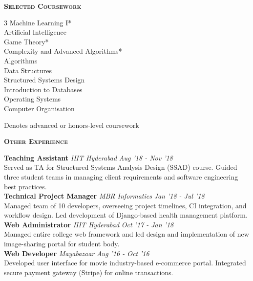\documentclass[10pt]{article}
\newcommand{\headerwidth}{7.45in}
\newenvironment{changemargin}[2]{%
  \begin{list}{}{%
    \setlength{\topsep}{0pt}%
    \setlength{\leftmargin}{#1}%
    \setlength{\rightmargin}{#2}%
    \setlength{\listparindent}{\parindent}%
    \setlength{\itemindent}{\parindent}%
    \setlength{\parsep}{\parskip}%
  }%
  \item[]}{\end{list}
}
\newcommand{\header}[1]{
	\begin{changemargin}{-0.75in}{-0.75in}
    \begin{tcolorbox}[colframe=mycolor,boxrule=0.0pt,arc=0pt,
      left=6pt,right=6pt,top=6pt,bottom=6pt,boxsep=0pt,width=\headerwidth]
		\scshape{\textbf{#1}}
\end{tcolorbox}
	\end{changemargin}
}
\newenvironment{body} {
	\vspace*{-16pt}
	\begin{changemargin}{-0.6in}{-0.65in}
  }
	{\end{changemargin}
}
\begin{document}
\smallskip
\header{Selected Coursework}
\begin{body}
	\vspace{4pt}
	\begin{multicols}{3}
	Machine Learning I*\\
	Artificial Intelligence\\
	Game Theory*\\
	Complexity and Advanced Algorithms*\\
	Algorithms\\
	Data Structures\\
	Structured Systems Design\\
	Introduction to Databases\\
	Operating Systems\\
	Computer Organisation\\
 	\end{multicols}
    {\footnotesize * Denotes advanced or honors-level coursework}
\end{body}


\smallskip
\header{Other Experience}
\begin{body}
	\vspace{10pt}
	\textbf{Teaching Assistant} \emph{IIIT Hyderabad} \hfill \emph{Aug '18 - Nov '18}\\
    Served as TA for Structured Systems Analysis Design (SSAD) course. Guided three student teams in managing client requirements and software engineering best practices.\\
    \smallskip{}
	\textbf{Technical Project Manager} \emph{MBR Informatics} \hfill \emph{Jan '18 - Jul '18}\\
    Managed team of 10 developers, overseeing project timelines, CI integration, and workflow design. Led development of Django-based health management platform.\\
    \smallskip{}
	\textbf{Web Administrator} \emph{IIIT Hyderabad} \hfill \emph{Oct '17 - Jan '18}\\
    Managed entire college web framework and led design and implementation of new image-sharing portal for student body.\\
    \smallskip{}
	\textbf{Web Developer} \emph{Mayabazaar} \hfill \emph{Aug '16 - Oct '16}\\
    Developed user interface for movie industry-based e-commerce portal. Integrated secure payment gateway (Stripe) for online transactions.\\
    \smallskip{}
\end{body}
\end{document}
